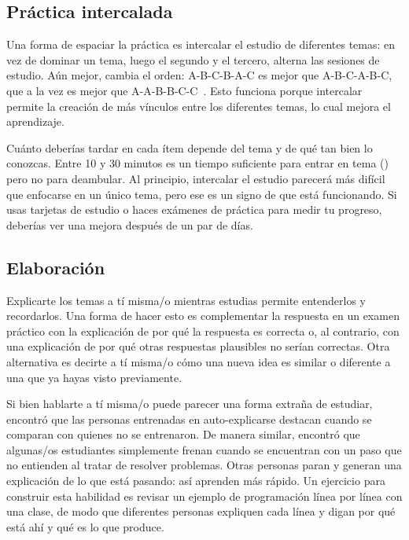 \subsection*{Práctica intercalada}

Una forma de espaciar la práctica es intercalar el estudio de diferentes temas:
en vez de dominar un tema,
luego el segundo y el tercero,
alterna las sesiones de estudio.
Aún mejor,
cambia el orden:
A-B-C-B-A-C es mejor que A-B-C-A-B-C,
que a la vez es mejor que A-A-B-B-C-C~\cite{Rohr2015}.
Esto funciona porque intercalar permite la creación de más vínculos entre los diferentes temas,
lo cual mejora el aprendizaje.

Cuánto deberías tardar en cada ítem
depende del tema y de qué tan bien lo conozcas.
Entre 10 y 30 minutos es un tiempo suficiente para
entrar en tema ()
pero no para deambular.
Al principio, intercalar el estudio parecerá más difícil que enfocarse en un único tema,
pero ese es un signo de que está funcionando.
Si usas tarjetas de estudio o haces exámenes de práctica para medir tu progreso,
deberías ver una mejora después de un par de días.

\subsection*{Elaboración}

Explicarte los temas a tí misma/o mientras estudias
permite entenderlos y recordarlos.
Una forma de hacer esto es complementar la respuesta en un examen práctico
con la explicación de por qué la respuesta es correcta
o, al contrario, con una explicación de por qué otras respuestas plausibles no serían correctas.
Otra alternativa es decirte a tí misma/o
cómo una nueva idea es similar o diferente a una que ya hayas visto previamente.

Si bien hablarte a tí misma/o puede parecer una forma extraña de estudiar,
~\cite{Biel1995} encontró que
las personas entrenadas en auto-explicarse destacan cuando se comparan con quienes no se entrenaron.
De manera similar,
\cite{Chi1989} encontró que algunas/os estudiantes simplemente frenan cuando se encuentran con un paso que no entienden
al tratar de resolver problemas.
Otras personas paran y generan una explicación de lo que está pasando:
así aprenden más rápido.
Un ejercicio para construir esta habilidad es revisar un ejemplo de programación línea por línea con una clase, de modo 
que diferentes personas expliquen cada línea
y digan por qué está ahí y qué es lo que produce.

